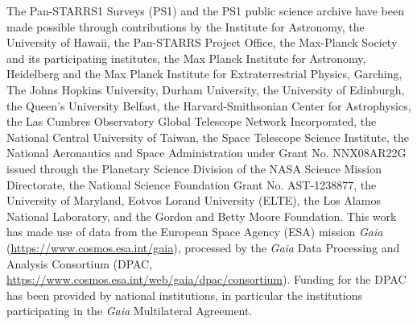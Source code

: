 \documentclass[manuscript]{aastex}
\begin{document}
\acknowledgments

The Pan-STARRS1 Surveys (PS1) and the PS1 public science archive have been made possible through contributions by the Institute for Astronomy, the University of Hawaii, the Pan-STARRS Project Office, the Max-Planck Society and its participating institutes, the Max Planck Institute for Astronomy, Heidelberg and the Max Planck Institute for Extraterrestrial Physics, Garching, The Johns Hopkins University, Durham University, the University of Edinburgh, the Queen's University Belfast, the Harvard-Smithsonian Center for Astrophysics, the Las Cumbres Observatory Global Telescope Network Incorporated, the National Central University of Taiwan, the Space Telescope Science Institute, the National Aeronautics and Space Administration under Grant No. NNX08AR22G issued through the Planetary Science Division of the NASA Science Mission Directorate, the National Science Foundation Grant No. AST-1238877, the University of Maryland, Eotvos Lorand University (ELTE), the Los Alamos National Laboratory, and the Gordon and Betty Moore Foundation.
This work has made use of data from the European Space Agency (ESA)
mission {\it Gaia} (\url{https://www.cosmos.esa.int/gaia}), processed by
the {\it Gaia} Data Processing and Analysis Consortium (DPAC,
\url{https://www.cosmos.esa.int/web/gaia/dpac/consortium}). Funding
for the DPAC has been provided by national institutions, in particular
the institutions participating in the {\it Gaia} Multilateral Agreement.
\end{document}

